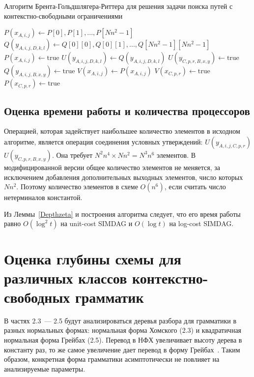 \begin{algorithm}[h!]
\caption{Алгоритм Брента-Гольдшлягера-Риттера для решения задачи поиска путей с контекстно-свободными ограничениями}\label{alg:BGR}
\begin{algorithmic}[1]
\State $\textit{$P(x_{A, i, j})$} \gets \textit{$P[0], P[1], ... , P[Nn^2 - 1]$}$
\State $\textit{$Q(y_{A,i,j,D,k,l})$} \gets \textit{$Q[0][0], Q[0][1], ... , Q[Nn^2 - 1] [Nn^2 - 1]$}$
\State $P(x_{A, i, j}) \gets \text{true}$
\EndIf
{}
\State $\textit{$U(y_{A,i,j,D,k,l})$} \gets \textit{$Q(y_{A,i,j,D,k,l})$}$
\State $U(y_{C,p,r,B,x,y}) \gets \text{true}$
\EndIf
{}
\State $Q(y_{A,i,j,B,x,y}) \gets \text{true}$
\EndIf
\State $V(x_{A, i, j}) \gets P(x_{A, i, j})$
\State $V(x_{C, p, r}) \gets \text{true}$
\EndIf
{}
\State $P(x_{C, p, r}) \gets \text{true}$
\EndIf
\EndFor
\end{algorithmic}
\end{algorithm}

\subsection{Оценка времени работы и количества процессоров}

Операцией, которая задействует наибольшее количество элементов в исходном алгоритме, является операция соединения условных утверждений: \textit{$U(y_{A,i,j,C,p,r})$} \text{$ \land $} \textit{$U(y_{C,p,r,B,x,y})$}. Она требует $N^2n^4 \times Nn^2 = N^3n^6$ элементов. В модифицированной версии общее количество элементов не меняется, за исключением добавления дополнительных выходных элементов, число которых $Nn^2$. Поэтому количество элементов в схеме $O(n^6)$, если считать число нетерминалов константой.

Из Леммы~\ref{Depthzeta} и построения алгоритма следует, что его время работы равно $O(\log^2t)$ на unit-cost SIMDAG и $O(\log t)$ на log-cost SIMDAG.

\section {Оценка глубины схемы для различных классов контекстно-свободных грамматик}В частях 2.3~--- 2.5 будут анализироваться деревья разбора для грамматики в разных нормальных формах: нормальная форма Хомского (2.3) и квадратичная нормальная форма Грейбах (2.5). Перевод в НФХ увеличивает высоту дерева в константу раз, то же самое увеличение дает перевод в форму Грейбах~\cite{Kelemenova}. Таким образом, конкретная форма грамматики асимптотически не повлияет на анализируемые параметры.
